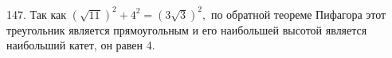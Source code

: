 147. Так как $(\sqrt{11})^2+4^2=(3\sqrt{3})^2,$ по обратной теореме Пифагора этот треугольник является прямоугольным и его наибольшей высотой является наибольший катет, он равен 4.\\
